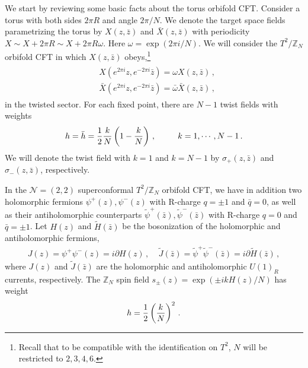 \documentclass[12pt]{article}
\begin{document}
We start by reviewing some basic facts about the torus orbifold CFT. Consider a torus with both sides $2\pi R$ and angle $2\pi /N$.  We denote the target space fields parametrizing the torus by  $X(z,\bar z) $ and $\bar X(z,\bar z)$ with periodicity $X \sim X +2\pi  R  \sim X +2\pi R \omega$.  Here $\omega=  \exp( 2\pi i/N)$.   We will consider the $T^2/\mathbb{Z}_N$ orbifold CFT in which  $X(z,\bar z)$ obeys,\footnote{Recall that to be compatible with the identification on $T^2$, $N$ will be restricted to $2,3,4,6$.}
\begin{align}
\begin{split}
&X(e^{2\pi i }z, e^{-2\pi i } \bar z)  =\omega X(z,  \bar z)   \,,\\
&\bar X(e^{2\pi i }z, e^{-2\pi i } \bar z)  =\bar\omega \bar X(z,  \bar z)\,,
\end{split}
\end{align}
in the twisted sector. 
For each fixed point, there are $N-1$ twist fields  with weights
\begin{align}
 h = \bar h  = {1\over2} { k\over N} \left( 1- \frac k  N  \right)\,,~~~~~~~~k=1,\cdots, N-1\,.
 \end{align}
We will denote  the twist field with $k=1$ and $k=N-1$ by $\sigma_+(z,\bar z)$ and $\sigma_-(z,\bar z)$, respectively.

In the $\mathcal{N}=(2,2)$ superconformal  $T^2/\mathbb{Z}_N$ orbifold CFT, we have in addition two holomorphic fermions $\psi^+(z),\psi^-(z)$ with R-charge $q=\pm1$ and $\bar q=0$, as well as  their antiholomorphic counterparts $\tilde \psi^+(\bar z), \tilde \psi^-(\bar z)$ with R-charge $q=0$ and $\bar q= \pm1$.  Let $H(z)$ and $\tilde H(\bar z)$ be the bosonization of the holomorphic and antiholomorphic fermions,
\begin{align}
J(z) =  \psi^+ \psi^-  (z)=  i \partial H(z)\,,~~~~~ \tilde J(\bar z) =  \tilde \psi^+\tilde {\psi}^-(\bar z) =  i \partial \tilde H(\bar z)\,,
\end{align} 
where $J(z)$ and $\tilde J(\bar z)$ are the holomorphic and antiholomorphic $U(1)_R$ currents, respectively.  
The $\mathbb{Z}_N$ spin field $s_\pm  (z)= \exp (\pm ikH(z)/N)$ has weight
\begin{align}
h= {1\over2} \left( k\over N\right)^2\,.
\end{align}
\end{document}

